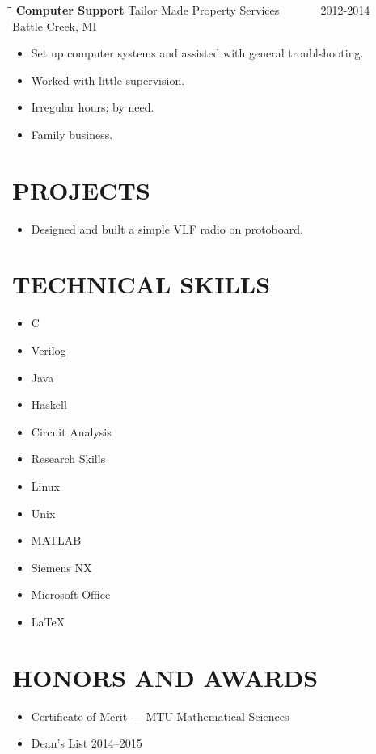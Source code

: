 \documentclass[letterpaper]{res}
\begin{document}
\begin{resume}
   \vspace{-0.15in}
   \begin{tabbing}
   \hspace{2.3in}\= \hspace{2.6in}\= \kill %
    {\bf Computer Support} \>Tailor Made Property Services \> ~~~~~~ 2012-2014\\
                          \>Battle Creek, MI
   \end{tabbing}\vspace{-10pt}
   \begin{itemize} \itemsep1pt \parskip0pt 
   \item Set up computer systems and assisted with general troublshooting.
   \item Worked with little supervision.
   \item Irregular hours; by need.
   \item Family business.
   \end{itemize}

\section{PROJECTS}
	\begin{itemize}
		\item Designed and built a simple VLF radio on protoboard.
	\end{itemize}

\section{TECHNICAL SKILLS}
	\vspace{-1pt}
	\begin{multicols}{4}
	\begin{itemize} \itemsep1pt \parskip0pt 
		\item C
		\item Verilog
		\item Java
		\item Haskell
		\item Circuit Analysis
		\item Research Skills
		\item Linux
		\item Unix
		\item MATLAB
		\item Siemens NX
		\item Microsoft Office
		\item LaTeX
	\end{itemize}
	\end{multicols}

\section{HONORS AND AWARDS}
	\begin{itemize}
		\item Certificate of Merit --- MTU Mathematical Sciences
		\item Dean's List 2014--2015
	\end{itemize}

\end{resume}
\end{document}
